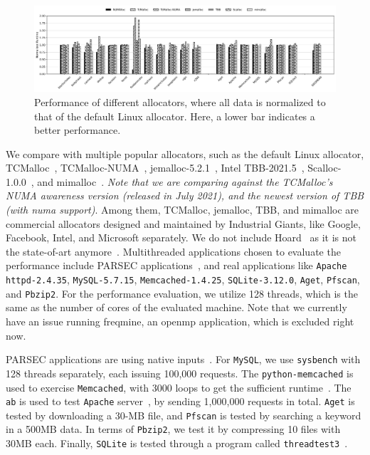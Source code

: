 \label{sec:performance}
\begin{figure}[!ht]
    \centering
    \includegraphics[width=7in]{EuroSys2022/figure/8-node-parsec-perf-update-tbb-tcmalloc.jpg}
    \caption{Performance of different allocators, where all data is normalized to \\ that of the default Linux allocator. Here, a lower bar indicates a better performance.
    \label{fig:perf}}
 \end{figure}
 
 
 
 We compare \NM{} with multiple popular allocators, such as the default Linux allocator, TCMalloc~\cite{tcmalloc2},  TCMalloc-NUMA~\cite{tcmallocnew}, jemalloc-5.2.1~\cite{jemalloc}, Intel TBB-2021.5~\cite{tbb2}, Scalloc-1.0.0~\cite{Scalloc}, and mimalloc~\cite{mimalloc}. \textit{Note that we are comparing against the TCMalloc's NUMA awareness version (released in July 2021), and the newest version of TBB (with numa support)}. Among them, TCMalloc, jemalloc, TBB, and mimalloc are commercial allocators designed and maintained by Industrial Giants, like Google, Facebook, Intel, and Microsoft separately. We do not include Hoard~\cite{Hoard} as it is not the state-of-art anymore~\cite{Scalloc, mimalloc}. Multithreaded applications chosen to evaluate the performance include PARSEC applications~\cite{parsec}, and real applications like \texttt{Apache httpd-2.4.35}, \texttt{MySQL-5.7.15}, \texttt{Memcached-1.4.25}, \texttt{SQLite-3.12.0}, \texttt{Aget}, \texttt{Pfscan}, and \texttt{Pbzip2}. For the performance evaluation, we utilize 128 threads, which is the same as the number of cores of the evaluated machine. Note that we currently have an issue running freqmine, an openmp application, which is excluded right now. 
 
PARSEC applications are using native inputs~\cite{parsec}. For \texttt{MySQL}, we use \texttt{sysbench} with 128 threads separately, each issuing 100,000 requests. The \texttt{python-memcached}  is used to exercise \texttt{Memcached}, with 3000 loops to get the sufficient runtime~\cite{memcached}. The \texttt{ab} is used to test \texttt{Apache} server~\cite{apachetest}, by sending 1,000,000 requests in total. \texttt{Aget} is tested by downloading a 30-MB file, and \texttt{Pfscan} is tested by searching  a keyword in a 500MB data. In terms of \texttt{Pbzip2}, we test it by compressing 10 files with 30MB each. Finally, \texttt{SQLite} is tested through a program called \texttt{threadtest3}~\cite{sqlitetest}. 

